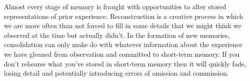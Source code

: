 Almost every stage of memory is fraught with opportunities to alter stored representations of prior experience. Reconstruction is a creative process in which we are more often than not forced to fill in some details that we might think we observed at the time but actually didn't. In the formation of new memories, consolidation can only make do with whatever information about the experience we have gleaned from observation and committed to short-term memory. If you don't rehearse what you've stored in short-term memory then it will quickly fade, losing detail and potentially introducing errors of omission and commission.



